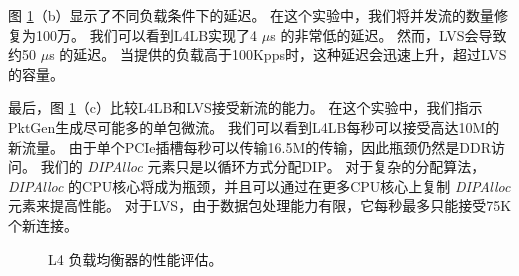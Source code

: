 图 \ref {clicknp:fig:l4}（b）显示了不同负载条件下的延迟。
在这个实验中，我们将并发流的数量修复为100万。
我们可以看到L4LB实现了4 $\mu$s 的非常低的延迟。
然而，LVS会导致约50 $\mu$s 的延迟。
当提供的负载高于100Kpps时，这种延迟会迅速上升，超过LVS的容量。

最后，图 \ref {clicknp:fig:l4}（c）比较L4LB和LVS接受新流的能力。
在这个实验中，我们指示PktGen生成尽可能多的单包微流。
我们可以看到L4LB每秒可以接受高达10M的新流量。
由于单个PCIe插槽每秒可以传输16.5M的传输，因此瓶颈仍然是DDR访问。
我们的 \textit {DIPAlloc} 元素只是以循环方式分配DIP。
对于复杂的分配算法，\textit {DIPAlloc} 的CPU核心将成为瓶颈，并且可以通过在更多CPU核心上复制 \textit {DIPAlloc} 元素来提高性能。
对于LVS，由于数据包处理能力有限，它每秒最多只能接受75K个新连接。


\begin{figure}[htbp]
	\centering
	
	
	
	\caption{L4 负载均衡器的性能评估。}
	\label{clicknp:fig:l4}
	
\end{figure}

